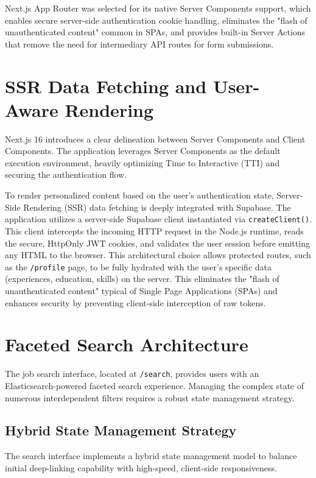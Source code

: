 Next.js App Router was selected for its native Server Components support, which enables secure server-side authentication cookie handling, eliminates the "flash of unauthenticated content" common in SPAs, and provides built-in Server Actions that remove the need for intermediary API routes for form submissions.

\section{SSR Data Fetching and User-Aware Rendering}
Next.js 16 introduces a clear delineation between Server Components and Client Components. The application leverages Server Components as the default execution environment, heavily optimizing Time to Interactive (TTI) and securing the authentication flow.

To render personalized content based on the user's authentication state, Server-Side Rendering (SSR) data fetching is deeply integrated with Supabase. The application utilizes a server-side Supabase client instantiated via \texttt{createClient()}. This client intercepts the incoming HTTP request in the Node.js runtime, reads the secure, HttpOnly JWT cookies, and validates the user session before emitting any HTML to the browser.
This architectural choice allows protected routes, such as the \texttt{/profile} page, to be fully hydrated with the user's specific data (experiences, education, skills) on the server. This eliminates the "flash of unauthenticated content" typical of Single Page Applications (SPAs) and enhances security by preventing client-side interception of raw tokens.

\section{Faceted Search Architecture}
The job search interface, located at \texttt{/search}, provides users with an Elasticsearch-powered faceted search experience. Managing the complex state of numerous interdependent filters requires a robust state management strategy.

\subsection{Hybrid State Management Strategy}
The search interface implements a hybrid state management model to balance initial deep-linking capability with high-speed, client-side responsiveness.


